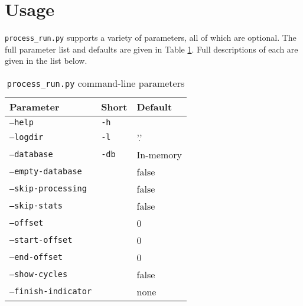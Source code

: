 \section{Usage}
\label{sec:proc_usage}
\par \texttt{process\_run.py} supports a variety of parameters, all of which are optional. The full parameter list and defaults are given in Table \ref{tbl:process_run_param}. Full descriptions of each are given in the list below.

\begin{table}
\caption{\texttt{process\_run.py} command-line parameters}
\label{tbl:process_run_param}
\centering
\begin{tabular}{l|l|l}
Parameter & Short & Default\\
\hline
\texttt{--help} & \texttt{-h} & \\
\texttt{--logdir} & \texttt{-l} & '.' \\
\texttt{--database} & \texttt{-db} & In-memory\\
\texttt{--empty-database} & & false\\
\texttt{--skip-processing} & & false\\
\texttt{--skip-stats} & & false\\
\texttt{--offset} & & 0\\
\texttt{--start-offset} & & 0\\
\texttt{--end-offset} & & 0\\
\texttt{--show-cycles} & & false\\
\texttt{--finish-indicator} & & none
\end{tabular}
\end{table}

